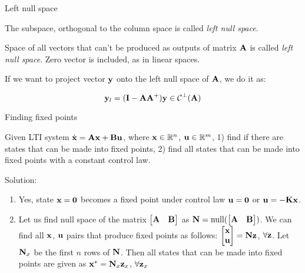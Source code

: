 \documentclass{beamer}
\begin{document}
\begin{frame}{Left null space}
\begin{flushleft}

The subspace, orthogonal to the column space is called \emph{left null space}.

\bigskip

\begin{definition}
Space of all vectors that can't be produced as outputs of matrix $\mathbf{A}$ is called \emph{left null space}. Zero vector is included, as in linear spaces.
\end{definition}

\bigskip

If we want to project vector $\mathbf{y}$ onto the left null space of $\mathbf{A}$, we do it as:

\begin{equation}
    \mathbf{y}_l = (\mathbf{I} - \mathbf{A}\mathbf{A}^+) \mathbf{y} \in \mathcal{C}^\perp(\mathbf{A})
\end{equation}

\end{flushleft}
\end{frame}




\begin{frame}{Finding fixed points}
\begin{flushleft}

Given LTI system $\dot{\mathbf{x}} = \mathbf{A} \mathbf{x} + \mathbf{B} \mathbf{u}$, where $\mathbf{x} \in \mathbb{R}^n$, $\mathbf{u} \in \mathbb{R}^m$, 1) find if there are states that can be made into fixed points, 2) find all states that can be made into fixed points with a constant control law.

\bigskip

Solution: 

\begin{enumerate}
    \item Yes, state $\mathbf{x} = \mathbf{0}$ becomes a fixed point under control law $\mathbf{u} = \mathbf{0}$ or $\mathbf{u} = -\mathbf{K}\mathbf{x}$.
    \item Let us find null space of the matrix $\begin{bmatrix} \mathbf{A} & \mathbf{B} \end{bmatrix}$ as $\mathbf{N} = \text{null} (\begin{bmatrix} \mathbf{A} & \mathbf{B} \end{bmatrix})$. We can find all $\mathbf{x}$, $\mathbf{u}$ pairs that produce fixed points as follows: $\begin{bmatrix} \mathbf{x} \\ \mathbf{u} \end{bmatrix} = \mathbf{N} \mathbf{z}$, $\forall \mathbf{z}$. Let $\mathbf{N}_x$ be the first $n$ rows of $\mathbf{N}$. Then all states that can be made into fixed points are given as $\mathbf{x}^* = \mathbf{N}_x \mathbf{z}_x$, $\forall \mathbf{z}_x$
\end{enumerate}

\end{flushleft}
\end{frame}
\end{document}
